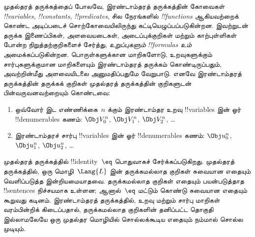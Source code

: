 \documentclass[../../../include/open-logic-section]{subfiles}
\begin{document}


முதல்தரத் தருக்கத்தைப் போலவே, இரண்டாம்தரத் தருக்கத்தின் கோவைகள்
\emph{!!{variable}s}, \emph{!!{constant}s}, \emph{!!{predicate}s},
சில நேரங்களில் \emph{!!{function}s} ஆகியவற்றைக் கொண்ட அடிப்படைச்
சொற்கோவையிலிருந்து கட்டியெழுப்பப்படுகின்றன. இவற்றுடன் தருக்க
இணைப்பிகள், அளவையடைகள், அடைப்புக்குறிகள் மற்றும் காற்புள்ளிகள் போன்ற
நிறுத்தற்குறிகளைச் சேர்த்து, \emph{உறுப்புகளும்}
\emph{!!{formula}s உம்} அமைக்கப்படுகின்றன. பொருள்களுக்கான மாறிகளோடு,
உறவுகளுக்கும் சார்புகளுக்குமான மாறிகளையும் இரண்டாம்தரத் தருக்கம்
கொண்டிருப்பதும், அவற்றின்மீது அளவையிடலை அனுமதிப்பதுமே வேறுபாடு.
எனவே இரண்டாம்தரத் தருக்கத்தின் தருக்கக் குறிகள் முதல்தரத்
தருக்கத்தின் குறிகளுடன் பின்வருவனவற்றையும் கொண்டவை:

\begin{enumerate}
\item ஒவ்வோர் இட எண்ணிக்கை~$n$ க்கும் இரண்டாம்தர உறவு
  !!{variable}s இன் ஓர் !!{denumerable}s கணம்:
  $\Obj V_0^n$, $\Obj V_1^n$, $\Obj V_2^n$, \dots
\item இரண்டாம்தரச் சார்பு !!{variable}s இன் ஓர் !!{denumerable}s கணம்:
  $\Obj u_0^n$, $\Obj u_1^n$, $\Obj u_2^n$, \dots
\end{enumerate}

முதல்தரத் தருக்கத்தில் !!{identity}~$\eq$ பொதுவாகச் சேர்க்கப்படுகிறது.
முதல்தரத் தருக்கத்தில், ஒரு மொழி~$\Lang{L}$ இன் தருக்கமல்லாத குறிகள்
சுவையான எதையும் வெளிப்படுத்த இன்றியமையாதவை. தருக்கமல்லாத குறிகள்
எதையும் பயன்படுத்தாத !!{sentence}s நிச்சயமாக உள்ளன; ஆனால்~$\eq$
மட்டும் கொண்டு சுவையான எதையும் கூறுவது கடினம். இரண்டாம்தரத்
தருக்கத்தில், உறவு மற்றும் சார்பு மாறிகள் வரம்பின்றிக் கிடைப்பதால்,
தருக்கமல்லாத குறிகளின் தனிப்பட்ட தொகுதி இல்லாமலேயே ஒரு முதல்தர
மொழியில் சொல்லக்கூடிய எதையும் நம்மால் சொல்ல முடியும்.
\end{document}
